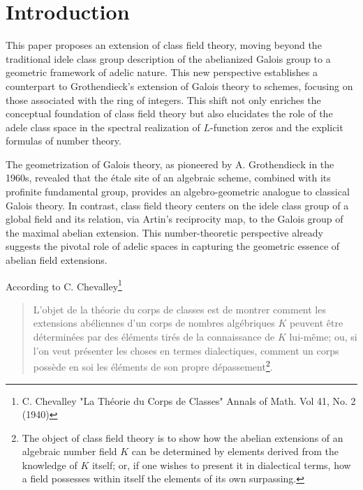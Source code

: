 \documentclass[letterpaper,11pt]{article}
\theoremstyle{plain}
\begin{document}
\tableofcontents


\hypersetup{linkcolor=citation}


\section{Introduction}

This paper proposes an extension of class field theory, moving beyond the traditional idele class group description of the abelianized Galois group to a geometric framework of adelic nature. This new perspective establishes a counterpart to Grothendieck’s extension of Galois theory to schemes, focusing on those associated with the ring of integers. This shift not only enriches the conceptual foundation of class field theory but also elucidates the role of the adele class space in  the spectral realization of $L$-function zeros and the explicit formulas of number theory.  

The geometrization of Galois theory, as pioneered by A. Grothendieck in the 1960s, revealed that the \'etale site of an algebraic scheme, combined with its profinite fundamental group, provides an algebro-geometric analogue to classical Galois theory. In contrast, class field theory centers on the idele class group of a global field and its relation, via Artin’s reciprocity map, to the Galois group of the maximal abelian extension. This number-theoretic perspective already suggests the pivotal role of adelic spaces in capturing the geometric essence of abelian field extensions.\vspace{.03in}




According to C. Chevalley\footnote{C. Chevalley "La Th\'eorie du Corps de Classes" Annals of Math. Vol 41, No. 2 (1940)} 
\begin{quote}L'objet de la th\' eorie du corps de classes est de montrer comment les extensions ab\' eliennes d'un corps de nombres alg\' ebriques $K$ peuvent \^etre d\' etermin\' ees par des \' el\' ements tir\' es de la connaissance de $K$ lui-m\^eme; ou, si l'on veut pr\' esenter les choses en termes dialectiques, comment un corps poss\`ede en soi les \' el\' ements de son propre d\' epassement\footnote{The object of class field theory is to show how the abelian extensions of an algebraic number field  $K$  can be determined by elements derived from the knowledge of  $K$  itself; or, if one wishes to present it in dialectical terms, how a field possesses within itself the elements of its own surpassing.}.
\end{quote}
\end{document}
